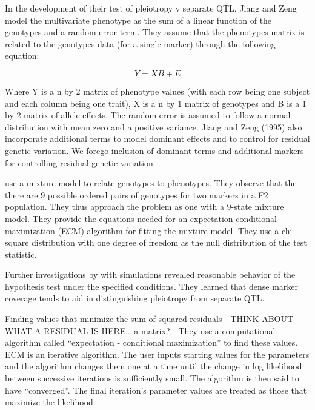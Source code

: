 \documentclass[]{article}
\begin{document}
In the development of their test of pleiotropy v separate QTL, Jiang and Zeng model the multivariate phenotype as the sum of a linear function of the genotypes and a random error term. They assume that the phenotypes matrix is related to the genotypes data (for a single marker) through the following equation:


\begin{equation}
Y = XB + E
\end{equation}


\noindent Where Y is a n by 2 matrix of phenotype values (with each row being one subject and each column being one trait), X is a n by 1 matrix of genotypes and B is a 1 by 2 matrix of allele effects. The random error is assumed to follow a normal distribution with mean zero and a positive variance. Jiang and Zeng (1995) also incorporate additional terms to model dominant effects and to control for residual genetic variation. We forego inclusion of dominant terms and additional markers for controlling residual genetic variation. 


\citet{jiang1995multiple} use a mixture model to relate genotypes to phenotypes. They observe that the there are 9 possible ordered pairs of genotypes for two markers in a F2 population. They thus approach the problem as one with a 9-state mixture model. They provide the equations needed for an expectation-conditional maximization (ECM) algorithm for fitting the mixture model. They use a chi-square distribution with one degree of freedom as the null distribution of the test statistic. 

Further investigations by \citet{jiang1995multiple} with simulations revealed reasonable behavior of the hypothesis test under the specified conditions. 
They learned that dense marker coverage tends to aid in distinguishing pleiotropy from separate QTL. 










 Finding values that minimize the sum of squared residuals - THINK ABOUT WHAT A RESIDUAL IS HERE… a matrix? - They use a computational algorithm called “expectation - conditional maximization” to find these values. ECM is an iterative algorithm. The user inputs starting values for the parameters and the algorithm changes them one at a time until the change in log likelihood between successive iterations is sufficiently small. The algorithm is then said to have ``converged''. The final iteration’s parameter values are treated as those that maximize the likelihood.
\end{document}
